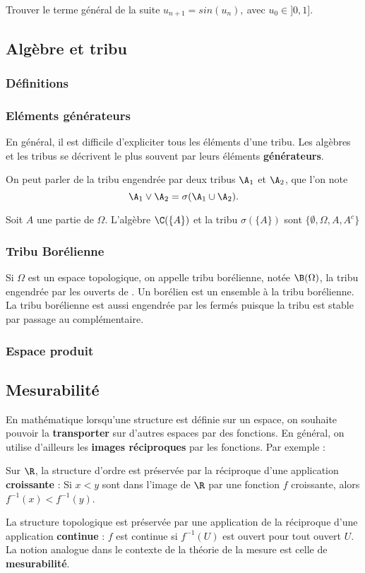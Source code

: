 \be {}
Trouver le terme général de la suite $u_{n+1} = sin(u_n), ~ $avec $u_0 \in ]0,1].$ 
\ee

\subsection{Algèbre et tribu }
\subsubsection{Définitions}
\ed

\ed




\subsubsection{Eléments générateurs }
En général, il est difficile d'expliciter tous les éléments d'une tribu. Les algèbres et les tribus se décrivent le plus souvent par leurs éléments \textbf{générateurs}.
\bd[Générateurs]
\ed

On peut parler de la tribu engendrée par deux tribus $\A_1$ et $\A_2$, que l'on note $$\A_1\lor \A_2 = \sigma(\A_1 \cup \A_2).$$

\bex
Soit $A$ une partie de $\Omega$. L'algèbre $\C(\{A\})$ et la tribu $\sigma(\{A\})$ sont $\{\emptyset, \Omega, A,A^c\}$
\eex

\subsubsection{Tribu Borélienne}
Si $\Omega$ est un espace topologique, on appelle tribu borélienne, notée $\B(\Omega)$, la tribu engendrée par les ouverts de \Omega. Un borélien est un ensemble à la tribu borélienne.
\ed
\bn
La tribu borélienne est aussi engendrée par les fermés puisque la tribu est stable par passage au complémentaire.
\en

\subsubsection{Espace produit}

\subsection{Mesurabilité}
En mathématique lorsqu'une structure est définie sur un espace, on souhaite pouvoir la \textbf{transporter} sur d'autres espaces par des fonctions. En général, on utilise d'ailleurs les \textbf{images réciproques} par les fonctions. 
\bex Par exemple :
\ben
    \item Sur $\R$, la structure d'ordre est préservée par la réciproque d'une application \textbf{croissante} : Si $x < y$ sont dans l'image de $\R$ par une fonction $f$ croissante, alors $f^{-1}(x) < f^{-1}(y)$.
    \item La structure topologique est préservée par une application de la réciproque d'une application \textbf{continue} : $f$ est continue si $f^{-1}(U)$ est ouvert pour tout ouvert $U$.
\een
\eex
La notion analogue dans le contexte de la théorie de la mesure est celle de \textbf{mesurabilité}.

